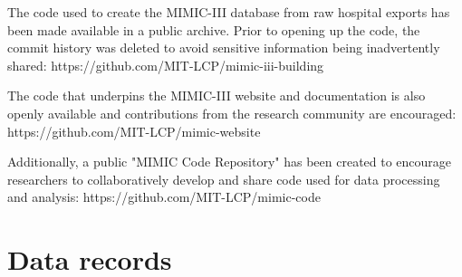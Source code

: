 \documentclass[english]{article}
\begin{document}
The code used to create the MIMIC-III database from raw hospital exports has been made available in a public archive. Prior to opening up the code, the commit history was deleted to avoid sensitive information being inadvertently shared: https://github.com/MIT-LCP/mimic-iii-building 

The code that underpins the MIMIC-III website and documentation is also openly available and contributions from the research community are encouraged: \\ https://github.com/MIT-LCP/mimic-website 

Additionally, a public "MIMIC Code Repository" has been created to encourage researchers to collaboratively develop and share code used for data processing and analysis: https://github.com/MIT-LCP/mimic-code


\section*{Data records}



\end{document}
